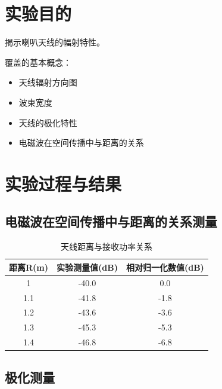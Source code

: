 \documentclass{../source/Experiment}
\begin{document}
    \section{实验目的}
        揭示喇叭天线的幅射特性。 \par 
        覆盖的基本概念：
        \begin{itemize}
            \item 天线辐射方向图
            \item 波束宽度
            \item 天线的极化特性
            \item 电磁波在空间传播中与距离的关系
        \end{itemize}
    \section{实验过程与结果}
        \subsection{电磁波在空间传播中与距离的关系测量}
            \begin{table}[H]
                \caption{天线距离与接收功率关系}
                \centering
                \begin{tabular}{|c|c|c|}
                \hline
                距离R(m) & 实验测量值(dB) & 相对归一化数值(dB) \\ \hline
                1      & -40.0     & 0.0         \\ \hline
                1.1    & -41.8     & -1.8        \\ \hline
                1.2    & -43.6     & -3.6        \\ \hline
                1.3    & -45.3     & -5.3        \\ \hline
                1.4    & -46.8     & -6.8        \\ \hline
                \end{tabular}
            \end{table}


        \subsection{极化测量}
\end{document}
